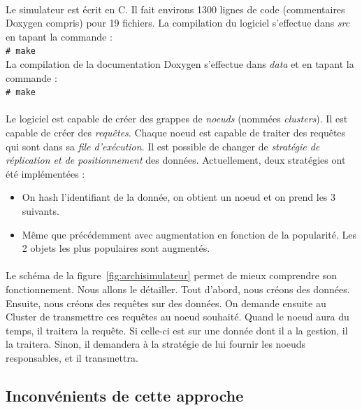 \documentclass[12pt]{article}
\newcommand{\shellcmd}[1]{\\\indent\indent\texttt{\footnotesize\# #1}\\}
\begin{document}
\paragraph{} Le simulateur est écrit en C. Il fait environs 1300 lignes de code (commentaires Doxygen compris) pour 19 fichiers. La compilation du logiciel s'effectue dans \textit{src} en tapant la commande  : \shellcmd{make}
La compilation de la documentation Doxygen s'effectue dans \textit{data} et en tapant la commande : \shellcmd{make}

\paragraph{}Le logiciel est capable de créer des grappes de \textit{noeuds} (nommées \textit{clusters}). Il est capable de créer des \textit{requêtes}. Chaque noeud est capable de traiter des requêtes qui sont dans sa \textit{file d'exécution}. Il est possible de changer de \textit{stratégie de réplication et de positionnement} des données. Actuellement, deux stratégies ont été implémentées :

\begin{itemize}
    \item On hash l'identifiant de la donnée, on obtient un noeud et on prend les 3 suivants.
    \item Même que précédemment avec augmentation en fonction de la popularité. Les 2 objets les plus populaires sont augmentés.
\end{itemize}

\paragraph{}Le schéma de la figure~\ref{fig:archisimulateur} permet de mieux comprendre son fonctionnement. Nous allons le détailler. \newline
Tout d'abord, nous créons des données. Ensuite, nous créons des requêtes sur des données. On demande ensuite au Cluster de transmettre ces requêtes au noeud souhaité. Quand le noeud aura du temps, il traitera la requête. Si celle-ci est sur une donnée dont il a la gestion, il la traitera. Sinon, il demandera à la stratégie de lui fournir les noeuds responsables, et il transmettra.

\subsection{Inconvénients de cette approche}
\end{document}
